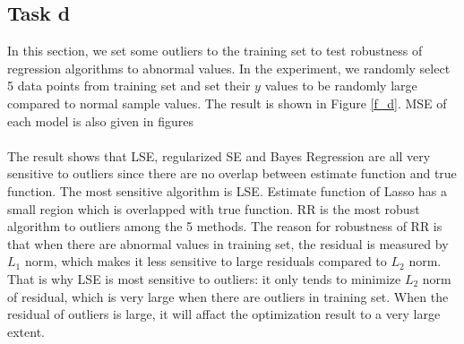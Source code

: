 \documentclass[a4paper]{article}
\begin{document}
\subsection{Task d}
In this section, we set some outliers to the training set to test robustness of regression algorithms to abnormal values. In the experiment, we randomly select 5 data points from training set and set their $y$ values to be randomly large compared to normal sample values. The result is shown in Figure \ref{f_d}. MSE of each model is also given in figures\\
\\
The result shows that LSE, regularized SE and Bayes Regression are all very sensitive to outliers since there are no overlap between estimate function and true function. The most sensitive algorithm is LSE. Estimate function of Lasso has a small region which is overlapped with true function. RR is the most robust algorithm to outliers among the 5 methods. The reason for robustness of RR is that when there are abnormal values in training set, the residual is measured by $L_1$ norm, which makes it less sensitive to large residuals compared to $L_2$ norm. That is why LSE is most sensitive to outliers: it only tends to minimize $L_2$ norm of residual, which is very large when there are outliers in training set. When the residual of outliers is large, it will affact the optimization result to a very large extent. 
\end{document}

